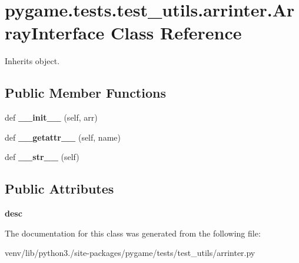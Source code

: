\hypertarget{classpygame_1_1tests_1_1test__utils_1_1arrinter_1_1_array_interface}{}\section{pygame.\+tests.\+test\+\_\+utils.\+arrinter.\+Array\+Interface Class Reference}
\label{classpygame_1_1tests_1_1test__utils_1_1arrinter_1_1_array_interface}


Inherits object.

\subsection*{Public Member Functions}
\begin{DoxyCompactItemize}
\item 
\mbox{\label{classpygame_1_1tests_1_1test__utils_1_1arrinter_1_1_array_interface_a4e5ef5115edcf9578947908ac2cee7bc}} 
def {\bfseries \+\_\+\+\_\+init\+\_\+\+\_\+} (self, arr)
\item 
\mbox{\label{classpygame_1_1tests_1_1test__utils_1_1arrinter_1_1_array_interface_aa728c6baf85507e01ab3eb405a54bbae}} 
def {\bfseries \+\_\+\+\_\+getattr\+\_\+\+\_\+} (self, name)
\item 
\mbox{\label{classpygame_1_1tests_1_1test__utils_1_1arrinter_1_1_array_interface_a793360f6ba16b5c54d3c9b7598ae69c3}} 
def {\bfseries \+\_\+\+\_\+str\+\_\+\+\_\+} (self)
\end{DoxyCompactItemize}
\subsection*{Public Attributes}
\begin{DoxyCompactItemize}
\item 
\mbox{\label{classpygame_1_1tests_1_1test__utils_1_1arrinter_1_1_array_interface_a1a813ced191cc373aa930aa7726f3a38}} 
{\bfseries desc}
\end{DoxyCompactItemize}


The documentation for this class was generated from the following file\+:\begin{DoxyCompactItemize}
\item 
venv/lib/python3./site-\/packages/pygame/tests/test\+\_\+utils/arrinter.\+py\end{DoxyCompactItemize}

